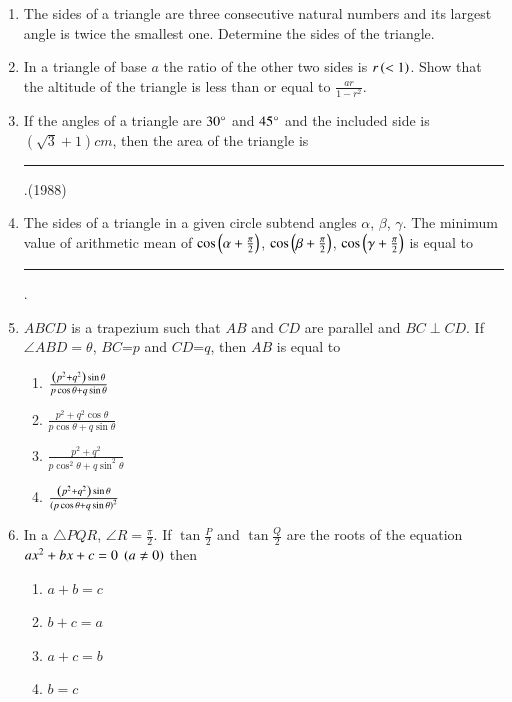 \begin{enumerate}[label=\thesubsection.\arabic*,ref=\thesubsection.\theenumi]
\hfill{}
%
\item The sides of a triangle are three consecutive natural numbers and its largest angle is twice the smallest one. Determine the sides of the triangle.
%
\hfill{}
%
\item In a triangle of base $a$ the ratio of the other two sides is $r\left(<1\right)$. Show that the altitude of the triangle is less than or equal to $\frac{ar}{1-r^2}$.
%
\hfill{}
%
%
    \item If the angles of a triangle are $30\degree$ and $45\degree$ and the included side is $(\sqrt{3} + 1) cm$, then the area of the triangle is \rule{1cm}{0.1pt}.\hfill (1988)
    \item The sides of a triangle in a given circle subtend angles $\alpha$, $\beta$, $\gamma$. The minimum value of arithmetic mean of $\cos \left(\alpha + \frac{\pi}{2}\right)$, $\cos \left(\beta + \frac{\pi}{2}\right)$, $\cos \left(\gamma + \frac{\pi}{2}\right)$ is equal to \rule{1cm}{0.1pt}.
        \hfill{}
\item $ABCD$ is a trapezium such that $AB$ and $CD$ are parallel and $BC\perp CD$. If $\angle ABD=\theta$, $BC$=$p$ and $CD$=$q$, then $AB$ is equal to
\hfill{}
\begin{multicols}{4} 
\begin{enumerate}
\item $\frac{\left(p^2+q^2\right)\sin\theta}{p\cos\theta+q\sin\theta}$
\item $\frac{p^2+q^2\cos\theta}{p\cos\theta+q\sin\theta}$
\item $\frac{p^2+q^2}{p\cos^2 \theta+q\sin^2 \theta}$
\item $\frac{\left(p^2+q^2\right)\sin\theta}{\left(p\cos\theta+q\sin\theta\right)^2}$
\end{enumerate}
\end{multicols}
\item In a $\triangle PQR$, $\angle R = \frac{\pi}{2}$. If $\tan{\frac{P}{2}}$ and $\tan{\frac{Q}{2}}$ are the roots of the equation $ax^2+bx+c=0 \;\left(a\neq0\right)$ then
        \hfill{}
        \begin{multicols}{4}
\begin{enumerate}
                \item $a+b=c$
                \item $b+c=a$
                \item $a+c=b$ 
                \item $b=c$
        \end{enumerate}

\end{multicols}
\end{enumerate}
